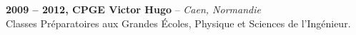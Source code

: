\documentclass[a4paper,11pt,final]{memoir}
\newcommand{\SmallSep}{\vspace{0.5em}}
\newcommand{\CVItem}[2]
	{\textbf{\color{RoyalBlue} #1 \color{dark_gray} #2}\normalsize\normalfont}
\newcommand{\city}[1]
	{{\small\color{dark_gray}\emph{#1}}\normalsize\normalfont}
\begin{document}
\CVItem{2009 -- 2012,}{CPGE Victor Hugo} -- \city{Caen, Normandie}\\
Classes Préparatoires aux Grandes Écoles, Physique et Sciences de l'Ingénieur.



\end{document}
